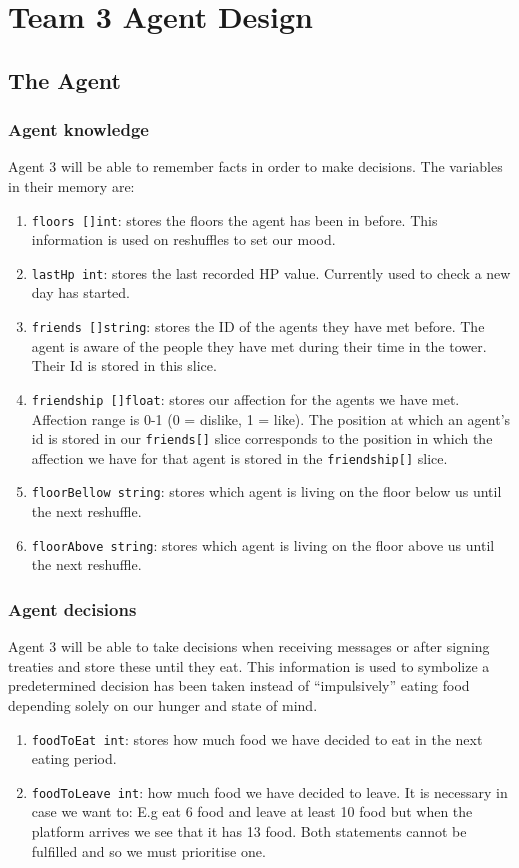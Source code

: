\chapter{Team 3 Agent Design}\label{team_3_agent_design}

\section{The Agent}\label{the_agent}

\subsection{Agent knowledge}
Agent 3 will be able to remember facts in order to make decisions. The variables in their memory are:
\begin{enumerate}
    \item \texttt{floors []int}: stores the floors the agent has been in before. This information is used on reshuffles to set our mood. 
    \item \texttt{lastHp int}: stores the last recorded HP value. Currently used to check a new day has started.
    \item \texttt{friends []string}: stores the ID of the agents they have met before. The agent is aware of the people they have met during their time in the tower. Their Id is stored in this slice. 
    \item \texttt{friendship []float}: stores our affection for the agents we have met. Affection range is 0-1 (0 = dislike, 1 = like). The position at which an agent's id is stored in our \texttt{friends[]} slice corresponds to the position in which the affection we have for that agent is stored in the \texttt{friendship[]} slice.
    \item \texttt{floorBellow string}: stores which agent is living on the floor below us until the next reshuffle.
    \item \texttt{floorAbove string}: stores which agent is living on the floor above us until the next reshuffle. 
  \end{enumerate}

\subsection{Agent decisions}
Agent 3 will be able to take decisions when receiving messages or after signing treaties and store these until they eat. This information is used to symbolize a predetermined decision has been taken instead of “impulsively” eating food depending solely on our hunger and state of mind.
\begin{enumerate}
    \item \texttt{foodToEat int}: stores how much food we have decided to eat in the next eating period.
    \item \texttt{foodToLeave int}: how much food we have decided to leave. It is necessary in case we want to: E.g eat 6 food and leave at least 10 food but when the platform arrives we see that it has 13 food. Both statements cannot be fulfilled and so we must prioritise one.
\end{enumerate}

